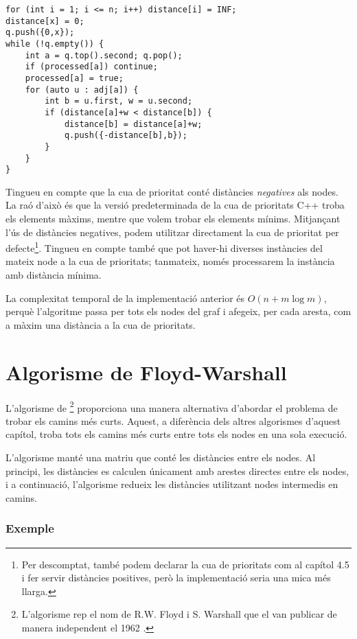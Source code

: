 \begin{lstlisting}
for (int i = 1; i <= n; i++) distance[i] = INF;
distance[x] = 0;
q.push({0,x});
while (!q.empty()) {
    int a = q.top().second; q.pop();
    if (processed[a]) continue;
    processed[a] = true;
    for (auto u : adj[a]) {
        int b = u.first, w = u.second;
        if (distance[a]+w < distance[b]) {
            distance[b] = distance[a]+w;
            q.push({-distance[b],b});
        }
    }
}
\end{lstlisting}


Tingueu en compte que la cua de prioritat conté distàncies
\emph{negatives} als nodes. La raó d'això és que la versió
predeterminada de la cua de prioritats C++ troba els elements màxims,
mentre que volem trobar els elements mínims. Mitjançant l'ús de
distàncies negatives, podem utilitzar directament la cua de prioritat
per defecte\footnote{Per descomptat, també podem declarar la cua de
prioritats com al capítol 4.5 i fer servir distàncies positives, però
la implementació seria una mica més llarga.}. Tingueu en compte també
que pot haver-hi diverses instàncies del mateix node a la cua de
prioritats; tanmateix, només processarem la instància amb distància
mínima.

La complexitat temporal de la implementació anterior és $O(n+m \log
m)$, perquè l'algoritme passa per tots els nodes del graf i afegeix, per
cada aresta, com a màxim una distància a la cua de prioritats.

\section{Algorisme de Floyd-Warshall}


L'algorisme de \footnote{L'algorisme rep el nom de
R.W. Floyd i S. Warshall que el van publicar de manera independent el
1962 \cite{flo62,war62}.} proporciona una manera alternativa d'abordar
el problema de trobar els camins més curts. Aquest, a diferència dels
altres algorismes d'aquest capítol, troba tots els camins més curts
entre tots els nodes en una sola execució.

L'algorisme manté una matriu que conté les distàncies entre els
nodes. Al principi, les distàncies es calculen únicament amb arestes
directes entre els nodes, i a continuació, l'algorisme redueix les
distàncies utilitzant nodes intermedis en camins.

\subsubsection{Exemple}

